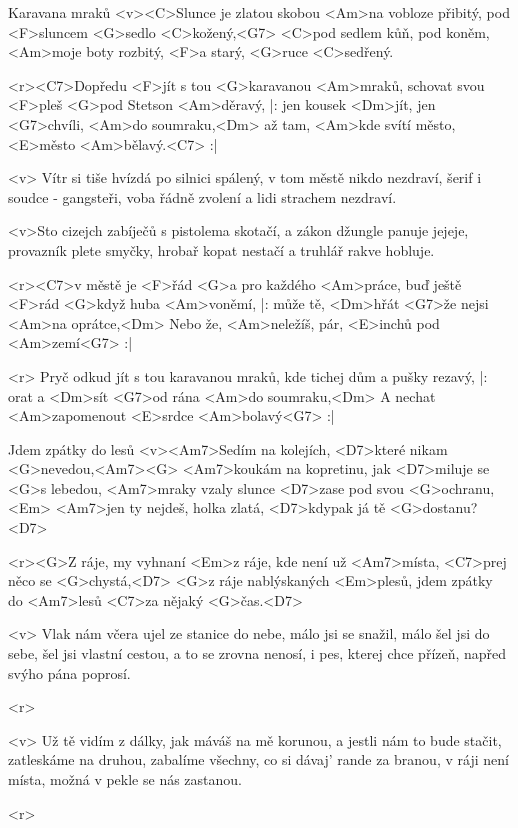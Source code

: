 \begin{song}{78}{Karavana mraků}{}
	<v><C>Slunce je zlatou skobou <Am>na vobloze přibitý,
	pod <F>sluncem <G>sedlo <C>kožený,<G7>
	<C>pod sedlem kůň, pod koněm, <Am>moje boty rozbitý,
	<F>a starý, <G>ruce <C>sedřený.

	<r><C7>Dopředu <F>jít s tou <G>karavanou <Am>mraků,
	schovat svou <F>pleš <G>pod Stetson <Am>děravý,
	|: jen kousek <Dm>jít, jen <G7>chvíli, <Am>do soumraku,<Dm>
	až tam, <Am>kde svítí město, <E>město <Am>bělavý.<C7> :|

	<v> Vítr si tiše hvízdá po silnici spálený,
	v tom městě nikdo nezdraví,
	šerif i soudce - gangsteři, voba řádně zvolení
	a lidi strachem nezdraví.

	<v>Sto cizejch zabíječů s pistolema skotačí,
	a zákon džungle panuje jejeje,
	provazník plete smyčky, hrobař kopat nestačí
	a truhlář rakve hobluje.

	<r><C7>v městě je <F>řád <G>a pro každého <Am>práce,
	buď ještě <F>rád <G>když huba <Am>voněmí,
	|: může tě, <Dm>hřát <G7>že nejsi <Am>na oprátce,<Dm>
	Nebo že, <Am>neležíš, pár, <E>inchů pod <Am>zemí<G7> :|

	<r> Pryč odkud jít s tou karavanou mraků,
	kde tichej dům a pušky rezavý,
	|: orat a <Dm>sít <G7>od rána <Am>do soumraku,<Dm>
	A nechat <Am>zapomenout <E>srdce <Am>bolavý<G7> :|
\end{song}

\begin{song}{79}{Jdem zpátky do lesů}{}
	<v><Am7>Sedím na kolejích, <D7>které nikam <G>nevedou,<Am7><G>
	<Am7>koukám na kopretinu, jak <D7>miluje se <G>s lebedou,
	<Am7>mraky vzaly slunce <D7>zase pod svou <G>ochranu,<Em>
	<Am7>jen ty nejdeš, holka zlatá, <D7>kdypak já tě <G>dostanu? <D7>

	<r><G>Z ráje, my vyhnaní <Em>z ráje,
	kde není už <Am7>místa, <C7>prej něco se <G>chystá,<D7>
	<G>z ráje nablýskaných <Em>plesů,
	jdem zpátky do <Am7>lesů <C7>za nějaký <G>čas.<D7>

	<v> Vlak nám včera ujel ze stanice do nebe,
	málo jsi se snažil, málo šel jsi do sebe,
	šel jsi vlastní cestou, a to se zrovna nenosí,
	i pes, kterej chce přízeň, napřed svýho pána poprosí.

	<r>

	<v> Už tě vidím z dálky, jak máváš na mě korunou,
	a jestli nám to bude stačit, zatleskáme na druhou,
	zabalíme všechny, co si dávaj' rande za branou,
	v ráji není místa, možná v pekle se nás zastanou.

	<r>
\end{song}

